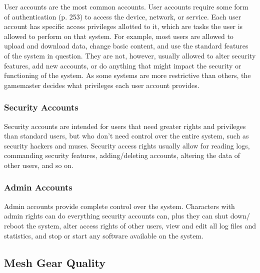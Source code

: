 User accounts are the most common accounts. User 
accounts require some form of authentication (p. 253) 
to access the device, network, or service. Each user account
has specific access privileges allotted to it, which
are tasks the user is allowed to perform on that system. 
For example, most users are allowed to upload and 
download data, change basic content, and use the 
standard features of the system in question. They are 
not, however, usually allowed to alter security features, 
add new accounts, or do anything that might impact 
the security or functioning of the system. As some systems
are more restrictive than others, the gamemaster
decides what privileges each user account provides.

\subsubsection{Security Accounts}

Security accounts are intended for users that need 
greater rights and privileges than standard users, but 
who don't need control over the entire system, such 
as security hackers and muses. Security access rights 
usually allow for reading logs, commanding security 
features, adding/deleting accounts, altering the data of 
other users, and so on.

\subsubsection{Admin Accounts}

Admin accounts provide complete control over the 
system. Characters with admin rights can do everything
security accounts can, plus they can shut down/
reboot the system, alter access rights of other users, 
view and edit all log files and statistics, and stop or 
start any software available on the system.

\subsection{Mesh Gear Quality}

